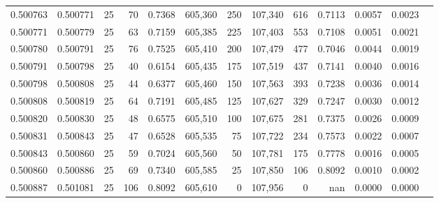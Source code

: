 \begin{tabular}{rrrrrrrrrrrrr}
0.500763 & 0.500771 &    25 &  70 &                                     0.7368 & 605,360 &     250 & 107,340 &     616 & 0.7113 & 0.0057 & 0.0023 \\
0.500771 & 0.500779 &    25 &  63 &                                     0.7159 & 605,385 &     225 & 107,403 &     553 & 0.7108 & 0.0051 & 0.0021 \\
0.500780 & 0.500791 &    25 &  76 &                                     0.7525 & 605,410 &     200 & 107,479 &     477 & 0.7046 & 0.0044 & 0.0019 \\
0.500791 & 0.500798 &    25 &  40 &                                     0.6154 & 605,435 &     175 & 107,519 &     437 & 0.7141 & 0.0040 & 0.0016 \\
0.500798 & 0.500808 &    25 &  44 &                                     0.6377 & 605,460 &     150 & 107,563 &     393 & 0.7238 & 0.0036 & 0.0014 \\
0.500808 & 0.500819 &    25 &  64 &                                     0.7191 & 605,485 &     125 & 107,627 &     329 & 0.7247 & 0.0030 & 0.0012 \\
0.500820 & 0.500830 &    25 &  48 &                                     0.6575 & 605,510 &     100 & 107,675 &     281 & 0.7375 & 0.0026 & 0.0009 \\
0.500831 & 0.500843 &    25 &  47 &                                     0.6528 & 605,535 &      75 & 107,722 &     234 & 0.7573 & 0.0022 & 0.0007 \\
0.500843 & 0.500860 &    25 &  59 &                                     0.7024 & 605,560 &      50 & 107,781 &     175 & 0.7778 & 0.0016 & 0.0005 \\
0.500860 & 0.500886 &    25 &  69 &                                     0.7340 & 605,585 &      25 & 107,850 &     106 & 0.8092 & 0.0010 & 0.0002 \\
0.500887 & 0.501081 &    25 & 106 &                                     0.8092 & 605,610 &       0 & 107,956 &       0 &    nan & 0.0000 & 0.0000 \\
\bottomrule
\end{tabular}
